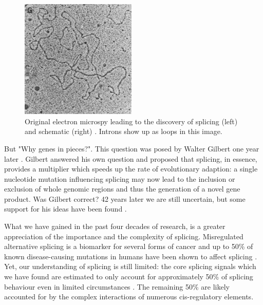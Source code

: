 \begin{figure}
	\centering
		\includegraphics[width=0.49\textwidth]{../visualizations/ch1-introduction/original_electron_microscopy.jpg}
	\caption{Original electron microspy leading to the discovery of splicing (left) and schematic (right) \cite{discoveryofsplicing}. Introns show up as loops in this image.  }
	\label{fig:discovery}
\end{figure}

But "Why genes in pieces?". This question was posed by Walter Gilbert one year later \cite{whygenesinpieces}. Gilbert answered his own question and proposed that splicing, in essence, provides a multiplier which speeds up the rate of evolutionary adaption: a single nucleotide mutation influencing splicing may now lead to the inclusion or exclusion of whole genomic regions and thus the generation of a novel gene product. Was Gilbert correct? 42 years later we are still uncertain, but some support for his ideas have been found \cite{whyrevisited}. %

What we have gained in the past four decades of research, is a greater appreciation of the importance and the complexity of splicing. 
Misregulated alternative splicing is a biomarker for several forms of cancer \cite{cancer} \cite{splicingcausescancer} and up to 50\% of known disease-causing mutations in humans have been shown to affect splicing \cite{50diseasessplicing}. 
Yet, our understanding of splicing is still limited: the core splicing signals which we have found are estimated to only account for approximately 50\% of splicing behaviour even in limited circumstances \cite{coresplicingsignals50percentexplainit}. The remaining 50\% are likely accounted for by the complex interactions of numerous cis-regulatory elements. 

